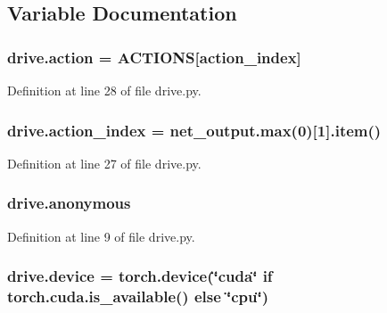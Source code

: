 \subsection{Variable Documentation}
\subsubsection[{\texorpdfstring{action}{action}}]{\setlength{\rightskip}{0pt plus 5cm}drive.\+action = A\+C\+T\+I\+O\+NS\mbox{[}{\bf action\+\_\+index}\mbox{]}}\hypertarget{namespacedrive_a68b3f3acb667a1c5e05d3ea265164d7a}{}\label{namespacedrive_a68b3f3acb667a1c5e05d3ea265164d7a}


Definition at line 28 of file drive.\+py.

\subsubsection[{\texorpdfstring{action\+\_\+index}{action_index}}]{\setlength{\rightskip}{0pt plus 5cm}drive.\+action\+\_\+index = net\+\_\+output.\+max(0)\mbox{[}1\mbox{]}.item()}\hypertarget{namespacedrive_a63845082ab90bdcccd95631ad6420392}{}\label{namespacedrive_a63845082ab90bdcccd95631ad6420392}


Definition at line 27 of file drive.\+py.

\subsubsection[{\texorpdfstring{anonymous}{anonymous}}]{\setlength{\rightskip}{0pt plus 5cm}drive.\+anonymous}\hypertarget{namespacedrive_a417833a8f645f1b27a7285408616a9f0}{}\label{namespacedrive_a417833a8f645f1b27a7285408616a9f0}


Definition at line 9 of file drive.\+py.

\subsubsection[{\texorpdfstring{device}{device}}]{\setlength{\rightskip}{0pt plus 5cm}drive.\+device = torch.\+device(\char`\"{}cuda\char`\"{} if torch.\+cuda.\+is\+\_\+available() else \char`\"{}cpu\char`\"{})}\hypertarget{namespacedrive_a23cc38e06b9fae695cf8845a82fcc273}{}\label{namespacedrive_a23cc38e06b9fae695cf8845a82fcc273}


